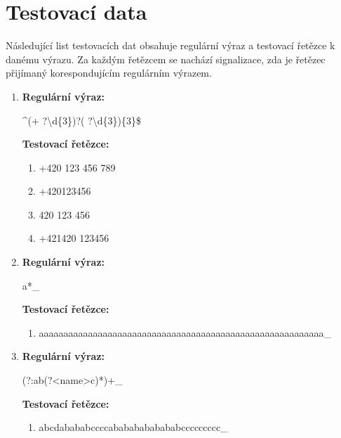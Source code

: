 \documentclass[czech,bachelor]{diploma}
\begin{document}
\chapter{Testovací data}\label{sec:TestingData}

Následující list testovacích dat obsahuje regulární výraz a testovací řetězce k danému výrazu.
Za každým řetězcem se nachází signalizace, zda je řetězec přijímaný korespondujícím regulárním výrazem.


\begin{enumerate}
    \item
    \noindent\textbf{Regulární výraz:}

    \textasciicircum (+ ?\textbackslash d\{3\})?( ?\textbackslash d\{3\})\{3\}\$

    \noindent\textbf{Testovací řetězce:}

    \begin{enumerate}
        \item +420 123 456 789 \setlength\parindent{1em} \textcolor{OliveGreen}{\Checkmark} \label{itm:TD_1a}
        \item +420123456 \setlength\parindent{1em} \textcolor{Red}{\XSolid} \label{itm:TD_1b}
        \item 420 123 456 \setlength\parindent{1em} \textcolor{OliveGreen}{\Checkmark} \label{itm:TD_1c}
        \item +421420 123456 \setlength\parindent{1em} \textcolor{OliveGreen}{\Checkmark} \label{itm:TD_1d}
    \end{enumerate}


    \item
    \noindent\textbf{Regulární výraz:} 

    a*\_

    \noindent\textbf{Testovací řetězce:}

    \begin{enumerate}
        \item aaaaaaaaaaaaaaaaaaaaaaaaaaaaaaaaaaaaaaaaaaaaaaaaaaaaaaaaaa\_ \setlength\parindent{1em} \textcolor{OliveGreen}{\Checkmark} \label{itm:TD_2a}
    \end{enumerate}


    \item 
    \noindent\textbf{Regulární výraz:} 

    (?:ab(?<name>c)*)+\_

    \noindent\textbf{Testovací řetězce:}

    \begin{enumerate}
        \item abcdabababccccabababababababccccccccc\_ \setlength\parindent{1em} \textcolor{OliveGreen}{\Checkmark} \label{itm:TD_3a}
    \end{enumerate}



\end{enumerate}
\end{document}
